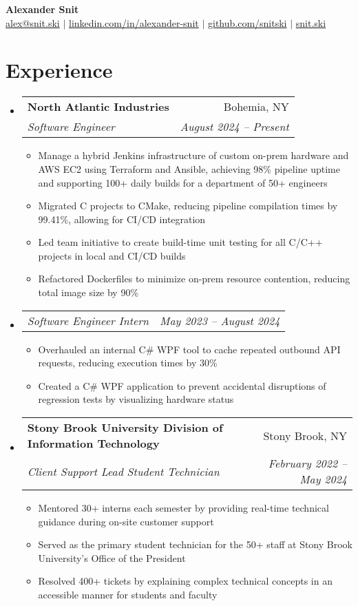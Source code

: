 \documentclass[letterpaper,11pt]{article}
\makeatletter
\newcommand{\resumeItem}[1]{
  \item\small{
    {#1 \vspace{-2pt}}
  }
}
\newcommand{\resumeSubheading}[4]{
  \vspace{-2pt}\item
    \begin{tabular*}{0.97\textwidth}[t]{l@{\extracolsep{\fill}}r}
      \textbf{#1} & #2 \\
      \textit{\small#3} & \textit{\small #4} \\
    \end{tabular*}\vspace{-7pt}
}
\newcommand{\resumeSubSubheading}[2]{
    \item
    \begin{tabular*}{0.97\textwidth}{l@{\extracolsep{\fill}}r}
      \textit{\small#1} & \textit{\small #2} \\
    \end{tabular*}\vspace{-7pt}
}
\newcommand{\resumeSubHeadingListStart}{\begin{itemize}[leftmargin=0.15in, label={}]}
\newcommand{\resumeSubHeadingListEnd}{\end{itemize}}
\newcommand{\resumeItemListStart}{\begin{itemize}}
\newcommand{\resumeItemListEnd}{\end{itemize}\vspace{-5pt}}
\makeatother
\begin{document}
\begin{center}
    \textbf{\Huge Alexander Snit} \\ \vspace{1pt}
    \href{mailto:alex@snit.ski}{alex@snit.ski} $|$
    \href{https://linkedin.com/in/alexander-snit}{linkedin.com/in/alexander-snit} $|$
    \href{https://github.com/snitski}{github.com/snitski} $|$
    \href{https://snit.ski}{snit.ski}
\end{center}

\section{Experience}
    \resumeSubHeadingListStart
        \resumeSubheading
        {North Atlantic Industries}{Bohemia, NY}
        {Software Engineer}{August 2024 -- Present}
        \resumeItemListStart
            \resumeItem{Manage a hybrid Jenkins infrastructure of custom on-prem hardware and AWS EC2 using Terraform and Ansible, achieving 98\% pipeline uptime and supporting 100+ daily builds for a department of 50+ engineers}
            \resumeItem{Migrated C projects to CMake, reducing pipeline compilation times by 99.41\%, allowing for CI/CD integration}
            \resumeItem{Led team initiative to create build-time unit testing for all C/C++ projects in local and CI/CD builds}
            \resumeItem{Refactored Dockerfiles to minimize on-prem resource contention, reducing total image size by 90\%}
        \resumeItemListEnd

        \resumeSubSubheading
        {Software Engineer Intern}{May 2023 -- August 2024}
        \resumeItemListStart
            \resumeItem{Overhauled an internal C\# WPF tool to cache repeated outbound API requests, reducing execution times by 30\%}
            \resumeItem{Created a C\# WPF application to prevent accidental disruptions of regression tests by visualizing hardware status}
        \resumeItemListEnd

        \resumeSubheading
        {Stony Brook University Division of Information Technology}{Stony Brook, NY}
        {Client Support Lead Student Technician}{February 2022 -- May 2024}
        \resumeItemListStart
            \resumeItem{Mentored 30+ interns each semester by providing real-time technical guidance during on-site customer support}
            \resumeItem{Served as the primary student technician for the 50+ staff at Stony Brook University's Office of the President}
            \resumeItem{Resolved 400+ tickets by explaining complex technical concepts in an accessible manner for students and faculty}
        \resumeItemListEnd
    \resumeSubHeadingListEnd
\end{document}
